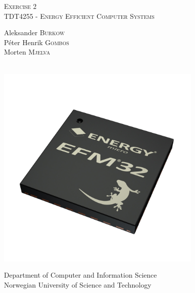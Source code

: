 \begin{titlepage}
  \begin{center}
    \huge
    \noindent\textsc{Exercise 2} \\
    \large
    \noindent\textsc{TDT4255 - Energy Efficient Computer Systems} \\ [2cm]
    \large

    \begin{minipage}{0.4\textwidth}
    \centering
      \noindent Aleksander \textsc{Burkow} \\
      \noindent Péter Henrik \textsc{Gombos} \\
      \noindent Morten \textsc{Mjelva} \\
    \end{minipage} \\[2cm]


    \includegraphics[width=0.75\textwidth]{figures/efm32}

    \vfill

    Department of Computer and Information Science \\
    Norwegian University of Science and Technology \\

  \end{center}
\end{titlepage}
